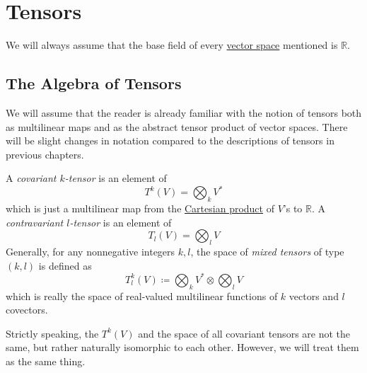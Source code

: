 \documentclass{article}
\newcounter{definition}[section]
\begin{document}
\section{Tensors}

  We will always assume that the base field of every \hyperref[lin-def:vector-space]{vector space} mentioned is $\mathbb{R}$. 

  \subsection{The Algebra of Tensors}

    We will assume that the reader is already familiar with the notion of tensors both as multilinear maps and as the abstract tensor product of vector spaces. There will be slight changes in notation compared to the descriptions of tensors in previous chapters. 

    \begin{definition}
      \label{def:covariant-k-tensor}
    A \textit{covariant $k$-tensor} is an element of 
    \begin{equation}
      T^k (V) = \bigotimes_k V^*
    \end{equation}
    which is just a multilinear map from the \hyperref[st-def:cart-prod-2]{Cartesian product} of $V$'s to $\mathbb{R}$. A \textit{contravariant $l$-tensor} is an element of 
    \begin{equation}
      T_l (V) = \bigotimes_l V
    \end{equation}
    Generally, for any nonnegative integers $k, l$, the space of \textit{mixed tensors} of type $(k, l)$ is defined as 
    \begin{equation}
      T^k_l (V) \coloneqq \bigotimes_k V^* \otimes \bigotimes_l V
    \end{equation}
    which is really the space of real-valued multilinear functions of $k$ vectors and $l$ covectors. 
    \end{definition}

    Strictly speaking, the $T^k (V)$ and the space of all covariant tensors are not the same, but rather naturally isomorphic to each other. However, we will treat them as the same thing. 
\end{document}
